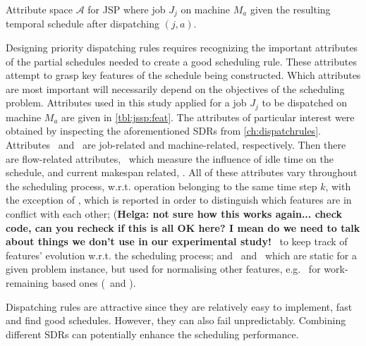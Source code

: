 \documentclass[smallextended]{svjour3}
\begin{document}
\begin{table}[t!] \centering
  \caption[Attribute space $\mathcal{A}$ for JPS]{Attribute space $\mathcal{A}$ for JSP where job $J_j$ on machine $M_a$ given the resulting temporal schedule after dispatching $(j,a)$.
  }
  \label{tbl:jssp:feat}
  
\end{table}
	
Designing priority dispatching rules requires recognizing the
important attributes of the partial schedules needed to create a good
scheduling rule. These attributes attempt to grasp key features of the schedule being
constructed. Which attributes are most important will necessarily depend on the
objectives of the scheduling problem. 
 Attributes used in this study applied for a job $J_j$ to
be dispatched on machine $M_a$ are given in \cref{tbl:jssp:feat}.
The attributes of particular interest were obtained by inspecting the
aforementioned SDRs from \cref{ch:dispatchrules}. Attributes \phiJobRelated\ and
\phiMacRelated\ are job-related and machine-related, respectively.
Then there are flow-related attributes, \phiFlowRelated\, which measure the influence of idle
time on the schedule, and current makespan related, \phiScheduleRelated.
All of these attributes vary throughout the scheduling process,
w.r.t. operation belonging to the same time step $k$, with the exception of
\phimac, which is reported in order to distinguish which features are
in conflict with each other;
({\bf Helga: not sure how this works again... check code, can you recheck if this is all OK here? I mean do we need to talk about things we don't use in our experimental study!}
 \phistep\ to keep track of features'
evolution w.r.t. the scheduling process; and \phitotalProc\ and
\phiwrmTotal\ which are static for a given problem instance, but used
for normalising other features, e.g. \phiwrmTotal\ for work-remaining
based ones (\phiwrmJob\ and \phiwrmMac).

Dispatching rules are attractive
since they are relatively easy to implement, fast and find good
schedules. However, they can also fail unpredictably. Combining
different SDRs can potentially enhance the
scheduling performance. 
	
	
\end{document}
